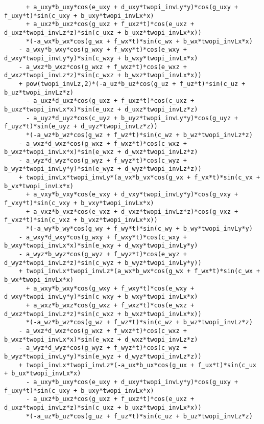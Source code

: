 \documentclass[10pt]{article}
\begin{document}
\begin{landscape}
\begin{footnotesize}
\begin{verbatim}
      + a_uxy*b_uxy*cos(e_uxy + d_uxy*twopi_invLy*y)*cos(g_uxy + f_uxy*t)*sin(c_uxy + b_uxy*twopi_invLx*x) 
      + a_uxz*b_uxz*cos(g_uxz + f_uxz*t)*cos(e_uxz + d_uxz*twopi_invLz*z)*sin(c_uxz + b_uxz*twopi_invLx*x))
      *(-a_wx*b_wx*cos(g_wx + f_wx*t)*sin(c_wx + b_wx*twopi_invLx*x)
	- a_wxy*b_wxy*cos(g_wxy + f_wxy*t)*cos(e_wxy + d_wxy*twopi_invLy*y)*sin(c_wxy + b_wxy*twopi_invLx*x) 
	- a_wxz*b_wxz*cos(g_wxz + f_wxz*t)*cos(e_wxz + d_wxz*twopi_invLz*z)*sin(c_wxz + b_wxz*twopi_invLx*x)) 
    + pow(twopi_invLz,2)*(-a_uz*b_uz*cos(g_uz + f_uz*t)*sin(c_uz + b_uz*twopi_invLz*z) 
      - a_uxz*d_uxz*cos(g_uxz + f_uxz*t)*cos(c_uxz + b_uxz*twopi_invLx*x)*sin(e_uxz + d_uxz*twopi_invLz*z) 
      - a_uyz*d_uyz*cos(c_uyz + b_uyz*twopi_invLy*y)*cos(g_uyz + f_uyz*t)*sin(e_uyz + d_uyz*twopi_invLz*z))
      *(-a_wz*b_wz*cos(g_wz + f_wz*t)*sin(c_wz + b_wz*twopi_invLz*z) 
	- a_wxz*d_wxz*cos(g_wxz + f_wxz*t)*cos(c_wxz + b_wxz*twopi_invLx*x)*sin(e_wxz + d_wxz*twopi_invLz*z) 
	- a_wyz*d_wyz*cos(g_wyz + f_wyz*t)*cos(c_wyz + b_wyz*twopi_invLy*y)*sin(e_wyz + d_wyz*twopi_invLz*z)) 
    + twopi_invLx*twopi_invLy*(a_vx*b_vx*cos(g_vx + f_vx*t)*sin(c_vx + b_vx*twopi_invLx*x) 
      + a_vxy*b_vxy*cos(e_vxy + d_vxy*twopi_invLy*y)*cos(g_vxy + f_vxy*t)*sin(c_vxy + b_vxy*twopi_invLx*x) 
      + a_vxz*b_vxz*cos(e_vxz + d_vxz*twopi_invLz*z)*cos(g_vxz + f_vxz*t)*sin(c_vxz + b_vxz*twopi_invLx*x))
      *(-a_wy*b_wy*cos(g_wy + f_wy*t)*sin(c_wy + b_wy*twopi_invLy*y) 
	- a_wxy*d_wxy*cos(g_wxy + f_wxy*t)*cos(c_wxy + b_wxy*twopi_invLx*x)*sin(e_wxy + d_wxy*twopi_invLy*y) 
	- a_wyz*b_wyz*cos(g_wyz + f_wyz*t)*cos(e_wyz + d_wyz*twopi_invLz*z)*sin(c_wyz + b_wyz*twopi_invLy*y)) 
    + twopi_invLx*twopi_invLz*(a_wx*b_wx*cos(g_wx + f_wx*t)*sin(c_wx + b_wx*twopi_invLx*x) 
      + a_wxy*b_wxy*cos(g_wxy + f_wxy*t)*cos(e_wxy + d_wxy*twopi_invLy*y)*sin(c_wxy + b_wxy*twopi_invLx*x) 
      + a_wxz*b_wxz*cos(g_wxz + f_wxz*t)*cos(e_wxz + d_wxz*twopi_invLz*z)*sin(c_wxz + b_wxz*twopi_invLx*x))
      *(-a_wz*b_wz*cos(g_wz + f_wz*t)*sin(c_wz + b_wz*twopi_invLz*z) 
	- a_wxz*d_wxz*cos(g_wxz + f_wxz*t)*cos(c_wxz + b_wxz*twopi_invLx*x)*sin(e_wxz + d_wxz*twopi_invLz*z) 
	- a_wyz*d_wyz*cos(g_wyz + f_wyz*t)*cos(c_wyz + b_wyz*twopi_invLy*y)*sin(e_wyz + d_wyz*twopi_invLz*z)) 
    + twopi_invLx*twopi_invLz*(-a_ux*b_ux*cos(g_ux + f_ux*t)*sin(c_ux + b_ux*twopi_invLx*x) 
      - a_uxy*b_uxy*cos(e_uxy + d_uxy*twopi_invLy*y)*cos(g_uxy + f_uxy*t)*sin(c_uxy + b_uxy*twopi_invLx*x) 
      - a_uxz*b_uxz*cos(g_uxz + f_uxz*t)*cos(e_uxz + d_uxz*twopi_invLz*z)*sin(c_uxz + b_uxz*twopi_invLx*x))
      *(-a_uz*b_uz*cos(g_uz + f_uz*t)*sin(c_uz + b_uz*twopi_invLz*z) 

\end{verbatim}
\end{footnotesize}
\end{landscape}
\end{document}
